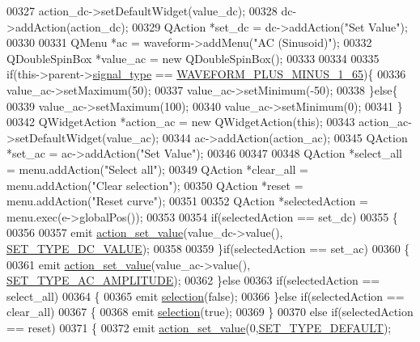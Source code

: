 \begin{DoxyCode}
00327     action\_dc->setDefaultWidget(value\_dc);
00328     dc->addAction(action\_dc);
00329     QAction *set\_dc = dc->addAction(\textcolor{stringliteral}{"Set Value"});
00330 
00331     QMenu   *ac = waveform->addMenu(\textcolor{stringliteral}{"AC (Sinusoid)"});
00332     QDoubleSpinBox *value\_ac = \textcolor{keyword}{new} QDoubleSpinBox();
00333 
00334 
00335     \textcolor{keywordflow}{if}(this->parent->\hyperlink{a00008_a070edaec5aee6ba1f5a6866bc32c8ce4}{signal\_type} == \hyperlink{a00090_a0923d3b365a36e1e8c401cec964aa36f}{WAVEFORM\_PLUS\_MINUS\_1\_65})\{
00336     value\_ac->setMaximum(50);
00337     value\_ac->setMinimum(-50);
00338     \}\textcolor{keywordflow}{else}\{
00339     value\_ac->setMaximum(100);
00340     value\_ac->setMinimum(0);
00341     \}
00342     QWidgetAction *action\_ac = \textcolor{keyword}{new} QWidgetAction(\textcolor{keyword}{this});
00343     action\_ac->setDefaultWidget(value\_ac);
00344     ac->addAction(action\_ac);
00345     QAction *set\_ac = ac->addAction(\textcolor{stringliteral}{"Set Value"});
00346 
00347 
00348     QAction *select\_all = menu.addAction(\textcolor{stringliteral}{"Select all"});
00349     QAction *clear\_all = menu.addAction(\textcolor{stringliteral}{"Clear selection"});
00350     QAction *reset = menu.addAction(\textcolor{stringliteral}{"Reset curve"});
00351 
00352     QAction *selectedAction = menu.exec(e->globalPos());
00353 
00354     \textcolor{keywordflow}{if}(selectedAction == set\_dc)
00355     \{
00356 
00357         emit \hyperlink{a00077_a886f07f2c612121bec703581f9398a10}{action\_set\_value}(value\_dc->value(),
      \hyperlink{a00090_a347f6ec80828b93988d22989c0df015f}{SET\_TYPE\_DC\_VALUE});
00358 
00359     \}\textcolor{keywordflow}{if}(selectedAction == set\_ac)
00360     \{
00361          emit \hyperlink{a00077_a886f07f2c612121bec703581f9398a10}{action\_set\_value}(value\_ac->value(),
      \hyperlink{a00090_a704f34d2cc6c149f96e9da9d2a1aa8c0}{SET\_TYPE\_AC\_AMPLITUDE});
00362     \}\textcolor{keywordflow}{else}
00363     \textcolor{keywordflow}{if}(selectedAction == select\_all)
00364     \{
00365          emit \hyperlink{a00077_a66bf875d43a16cf37527ab75c439fd8e}{selection}(\textcolor{keyword}{false});
00366     \}\textcolor{keywordflow}{else} \textcolor{keywordflow}{if}(selectedAction == clear\_all)
00367     \{
00368          emit \hyperlink{a00077_a66bf875d43a16cf37527ab75c439fd8e}{selection}(\textcolor{keyword}{true});
00369     \}
00370     \textcolor{keywordflow}{else} \textcolor{keywordflow}{if}(selectedAction == reset)
00371     \{
00372          emit \hyperlink{a00077_a886f07f2c612121bec703581f9398a10}{action\_set\_value}(0,\hyperlink{a00090_afd1036bf6329d2ac31913e14c1f56725}{SET\_TYPE\_DEFAULT});

\end{DoxyCode}
